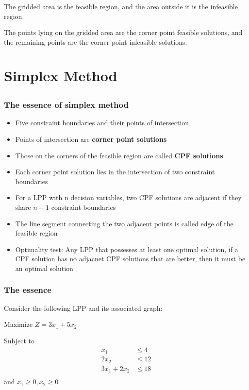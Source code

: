 \documentclass[12pt]{article}
\begin{document}
The gridded area is the feasible region, and the area outside it is the infeasible region.

The points lying on the gridded area are the corner point feasible solutions, and the remaining points are the 
corner point infeasible solutions. 

\section{Simplex Method}
\subsection{}


\subsubsection*{The essence of simplex method}
\begin{itemize}
\item Five constraint boundaries and their points of intersection
\item Points of intersection are \textbf{corner point solutions}
\item Those on the corners of the feasible region are called \textbf{CPF solutions}
\item Each corner point solution lies in the intersection of two constraint boundaries
\item For a LPP with n decision variables, two CPF solutions are adjacent if they share $n-1$ constraint boundaries
\item The line segment connecting the two adjacent points is called edge of the feasible region
\item Optimality test: Any LPP that possesses at least one optimal solution, if a CPF solution has no adjacnet CPF solutions 
that are better, then it must be an optimal solution
\end{itemize}

  \subsubsection*{The essence}
Consider the following LPP and its associated graph:

Maximize $Z=3 x_1 + 5 x_2$

Subject to 
\begin{align*}
x_1           & \le 4  \\
2 x_2         & \le 12 \\
3 x_1 + 2 x_2 & \le 18 \\
\end{align*}
and 
$x_1 \ge 0, x_2 \ge 0$
\end{document}
